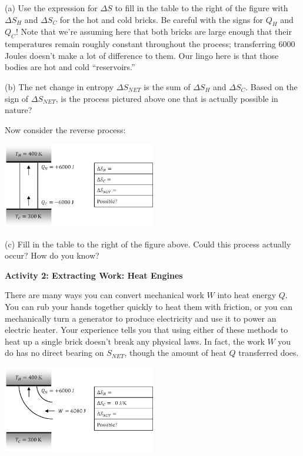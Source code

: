 (a) Use the expression for $\Delta S$ to fill in the table to the right of the figure with $\Delta S_H$ and $\Delta S_C$ for the hot and cold bricks.  Be careful with the signs for $Q_H$ and $Q_C$!  
Note that we're assuming here that both bricks are large enough that their temperatures remain roughly constant throughout the process; transferring 6000 Joules doesn't make a lot of difference to them.  Our lingo here is that those bodies are hot and cold ``reservoirs.''   
\answerspace{0.2 in}

(b) The net change in entropy $\Delta S_{NET}$ is the sum of $\Delta S_H$ and $\Delta S_C$.  Based on the sign of $\Delta S_{NET}$, is the process pictured above one that is actually possible in nature?
\answerspace{0.6 in}

\pagebreak[2]
Now consider the reverse process:

\begin{center}
\vspace{-0.2 in}
\includegraphics[width=0.5\textwidth]{entropy_is_it_possible/fig2.eps}
\vspace{-0.2 in}
\end{center}

(c) Fill in the table to the right of the figure above.   Could this process actually occur?  How do you know?
\answerspace{0.6 in}

\textbf{Activity 2: Extracting Work: Heat Engines}

There are many ways you can convert mechanical work $W$ into heat energy $Q$.  You can rub your hands together quickly to heat them with friction, or you can mechanically turn a generator to produce electricity and use it to power an electric heater.  Your experience tells you that using either of these methods to heat up a single brick doesn't break any physical laws.  In fact, the work $W$ you do has no direct bearing on $S_{NET}$, though the amount of heat $Q$ transferred does.

\begin{center}
\vspace{-0.2 in}
\includegraphics[width=0.5\textwidth]{entropy_is_it_possible/fig3.eps}
\vspace{-0.2 in}
\end{center}


